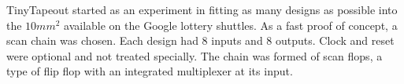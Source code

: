%
%
%
%
%
%
%
%
%
%
%
%
%
%
%
%

TinyTapeout started as an experiment in fitting as many designs as possible into the \(10 mm^2\) available on the Google lottery shuttles.
As a fast proof of concept, a scan chain was chosen.
Each design had 8 inputs and 8 outputs.
Clock and reset were optional and not treated specially. The chain was formed of scan flops\cite{skywaterpdk}, a type of flip flop with an integrated multiplexer at its input.

